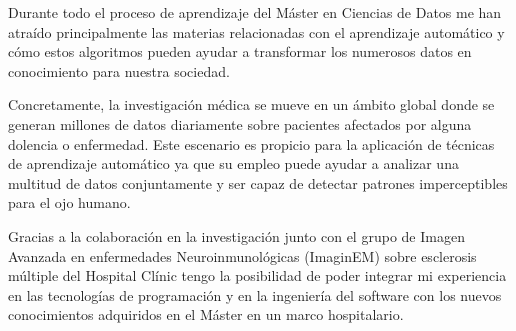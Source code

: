 Durante todo el proceso de aprendizaje del Máster en Ciencias de Datos me han atraído principalmente las materias relacionadas con el aprendizaje automático y cómo estos algoritmos pueden ayudar a transformar los numerosos datos en conocimiento para nuestra sociedad. 

Concretamente, la investigación médica se mueve en un ámbito global donde se generan millones de datos diariamente sobre pacientes afectados por alguna dolencia o enfermedad. Este escenario es propicio para la aplicación de técnicas de aprendizaje automático ya que su empleo puede ayudar a analizar una multitud de datos conjuntamente y ser capaz de detectar patrones imperceptibles para el ojo humano.

Gracias a la colaboración en la investigación junto con el grupo de Imagen Avanzada en enfermedades Neuroinmunológicas (ImaginEM) sobre esclerosis múltiple del Hospital Clínic tengo la posibilidad de poder integrar mi experiencia en las tecnologías de programación y en la ingeniería del software con los nuevos conocimientos adquiridos en el Máster en un marco hospitalario.
